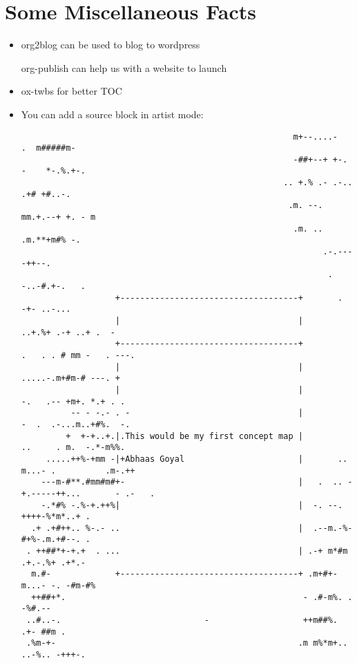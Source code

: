 \documentclass[11pt]{article}
\begin{document}
\section{Some Miscellaneous Facts}
\label{sec:org90bd3d0}
\begin{itemize}
\item org2blog can be used to blog to wordpress

org-publish can help us with a website to launch
\item ox-twbs for better TOC
\item You can add a source block in artist mode:

\begin{verbatim}
                                                       m+--....-     .  m#####m-
                                                       -##+--+ +-. -    *-.%.+-.
                                                     .. +.% .- .-..  .+# +#..-.
                                                      .m. --. mm.+.--+ +. - m
                                                       .m. .. .m.**+m#% -.
                                                             .-.----++--.
                                                              . -..-#.+-.   .
                   +------------------------------------+       .   -+- ..-...
                   |                                    |            ..+.%+ .-+ ..+ .  -
                   +------------------------------------+          .   . . # mm -   . ---.
                   |                                    |             .....-.m+#m-# ---. +
                   |                                    |               -.   .-- +m+. *.+ . .
          -- - -.- . -                                  |                -  .  .-...m..+#%.  -.
         +  +-+..+.|.This would be my first concept map |               ..     . m.  -.*-m%%.
     .....++%-+mm -|+Abhaas Goyal                       |       ..    m...- .          .m-.++
    ---m-#**.#mm#m#+-                                   |   .  .. -+.-----++...       - .-   .
    -.*#% -.%-+.++%|                                    |  -. --. ++++-%*m*..+ .
  .+ .+#++.. %-.- ..                                    |  .--m.-%-#+%-.m.+#--. .
 . ++##*+-+.+  . ...                                    | .-+ m*#m .+.-.%+ .+*.-
  m.#-             +------------------------------------+ .m+#+-m...- -. -#m-#%
  ++##+*.                                                - .#-m%. .        -%#.--
 ..#..-.                             -                   ++m##%.        .+- ##m .
 .%m-+-                                                 .m m%*m+.. ..-%.. -+++-.

\end{verbatim}
\end{itemize}
\end{document}
